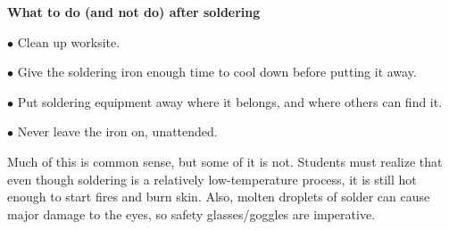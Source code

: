 \vskip 10pt

\noindent
{\bf What to do (and not do) after soldering}

\item{$\bullet$} Clean up worksite.
\item{$\bullet$} Give the soldering iron enough time to cool down before putting it away.
\item{$\bullet$} Put soldering equipment away where it belongs, and where others can find it.
\item{$\bullet$} Never leave the iron on, unattended.







Much of this is common sense, but some of it is not.  Students must realize that even though soldering is a relatively low-temperature process, it is still hot enough to start fires and burn skin.  Also, molten droplets of solder can cause major damage to the eyes, so safety glasses/goggles are imperative.




